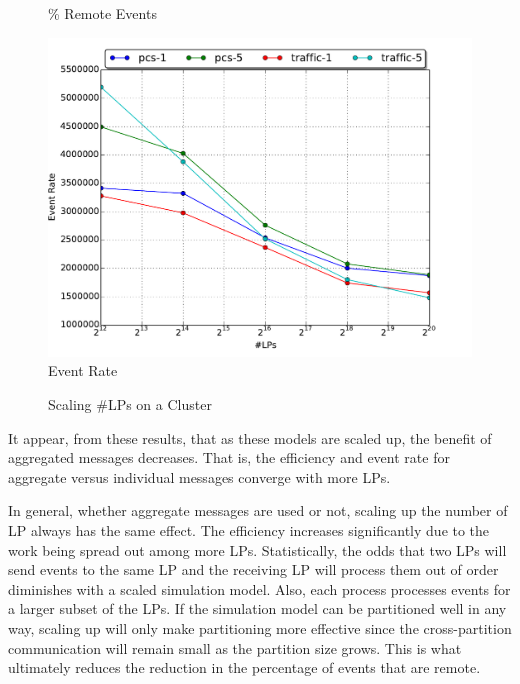 \documentclass[11pt]{book}
\begin{document}
\begin{figure}
\begin{minipage}{.5\textwidth}
\begin{center}
      \% Remote Events \\
    \end{center}
  \end{minipage}
  \centering
  \begin{minipage}{.5\textwidth}
    \begin{center}
      \includegraphics[width=\textwidth,keepaspectratio,quiet]{figs/scale/scale_event_rate.pdf} \\
      Event Rate \\
    \end{center}
  \end{minipage}
  \caption{Scaling \#LPs on a Cluster}\label{scaling}
\end{figure}

It appear, from these results, that as these models are scaled up, the benefit of aggregated
messages decreases.  That is, the efficiency and event rate for aggregate versus individual messages
converge with more LPs.

In general, whether aggregate messages are used or not, scaling up the number of LP always has the
same effect.  The efficiency increases significantly due to the work being spread out among more
LPs.  Statistically, the odds that two LPs will send events to the same LP and the receiving LP will
process them out of order diminishes with a scaled simulation model.  Also, each process processes
events for a larger subset of the LPs.  If the simulation model can be partitioned well in any way,
scaling up will only make partitioning more effective since the cross-partition communication will
remain small as the partition size grows.  This is what ultimately reduces the reduction in the
percentage of events that are remote.
\end{document}
